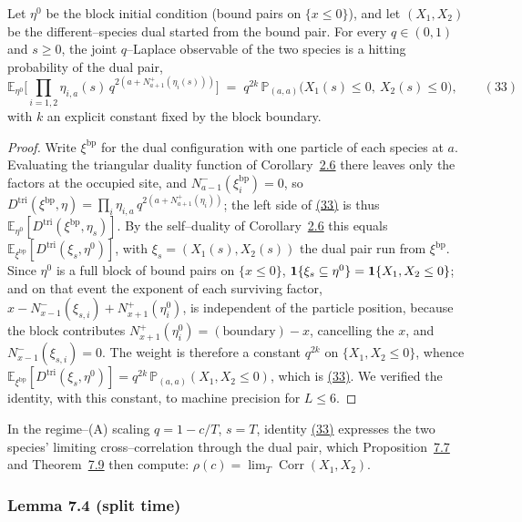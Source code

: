 \documentclass[11pt]{article}
\theoremstyle{plain}
\theoremstyle{definition}
\theoremstyle{remark}
\DeclareMathOperator{\Corr}{Corr}\DeclareMathOperator{\cum}{cum}
\newcommand{\E}{\mathbb{E}}\newcommand{\PP}{\mathbb{P}}\newcommand{\dd}{\,\mathrm{d}}
\begin{document}
Let $\eta^0$ be the block initial condition (bound pairs on $\{x\le0\}$), and let
$(X_1,X_2)$ be the different--species dual started from the bound pair. For every
$q\in(0,1)$ and $s\ge0$, the joint $q$--Laplace observable of the two species is a
hitting probability of the dual pair,
\label{eq_crossbridge}
\begin{equation}
  \E_{\eta^0}\Big[\textstyle\prod_{i=1,2}\eta_{i,a}(s)\,
     q^{2\left(a+N^+_{a+1}(\eta_i(s))\right)}\Big]
   \;=\; q^{2k}\,\PP_{(a,a)}\big(X_1(s)\le0,\ X_2(s)\le0\big),\qquad(33)
\end{equation}
with $k$ an explicit constant fixed by the block boundary.
\par
\begin{proof}
Write $\xi^{\mathrm{bp}}$ for the dual configuration with one particle of each species at
$a$. Evaluating the triangular duality function of Corollary~\hyperref[cor_tri]{2.6} there leaves
only the factors at the occupied site, and $N^-_{a-1}(\xi^{\mathrm{bp}}_i)=0$, so
$D^{\mathrm{tri}}(\xi^{\mathrm{bp}},\eta)=\prod_i\eta_{i,a}\,q^{2(a+N^+_{a+1}(\eta_i))}$;
the left side of \hyperref[eq_crossbridge]{(33)} is thus
$\E_{\eta^0}[D^{\mathrm{tri}}(\xi^{\mathrm{bp}},\eta_s)]$. By the self--duality of
Corollary~\hyperref[cor_tri]{2.6} this equals $\E_{\xi^{\mathrm{bp}}}[D^{\mathrm{tri}}(\xi_s,\eta^0)]$,
with $\xi_s=(X_1(s),X_2(s))$ the dual pair run from $\xi^{\mathrm{bp}}$. Since $\eta^0$ is
a full block of bound pairs on $\{x\le0\}$, $\mathbf 1\{\xi_s\subseteq\eta^0\}=\mathbf 1\{X_1,X_2\le0\}$;
and on that event the exponent of each surviving factor,
$x-N^-_{x-1}(\xi_{s,i})+N^+_{x+1}(\eta^0_i)$, is independent of the particle position,
because the block contributes $N^+_{x+1}(\eta^0_i)=(\text{boundary})-x$, cancelling the
$x$, and $N^-_{x-1}(\xi_{s,i})=0$. The weight is therefore a constant $q^{2k}$ on
$\{X_1,X_2\le0\}$, whence
$\E_{\xi^{\mathrm{bp}}}[D^{\mathrm{tri}}(\xi_s,\eta^0)]=q^{2k}\,\PP_{(a,a)}(X_1,X_2\le0)$,
which is \hyperref[eq_crossbridge]{(33)}. We verified the identity, with this constant, to machine
precision for $L\le6$.
\end{proof}

In the regime--(A) scaling $q=1-c/T$, $s=T$, identity \hyperref[eq_crossbridge]{(33)} expresses the
two species' limiting cross--correlation through the dual pair, which
Proposition~\hyperref[prop_twophase]{7.7} and Theorem~\hyperref[thm_closed]{7.9} then compute:
$\rho(c)=\lim_T\Corr(X_1,X_2)$.

\subsubsection{Lemma 7.4 (split time)}\label{lem_split}
\end{document}
